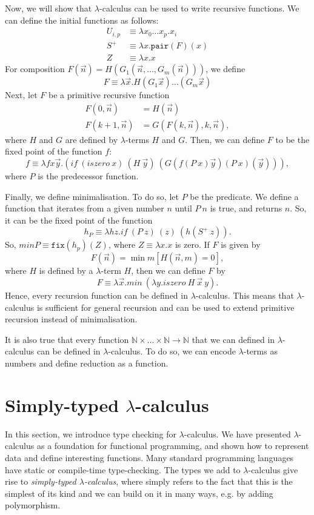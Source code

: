 \documentclass[a4paper, openany]{memoir}
\theoremstyle{definition}
\begin{document}
    Now, we will show that $\lambda$-calculus can be used to write recursive functions. We can define the initial functions as follows:
    \begin{align*}
        U_{i, p} &\equiv \lambda x_0 \dots x_p. x_i \\
        S^+ &\equiv \lambda x.\texttt{pair}(F)(x) \\
        Z &\equiv \lambda x.x
    \end{align*}
    For composition $F(\vec{n}) = H(G_1(\vec{n}, \dots, G_m(\vec{n})))$, we define
    \[F \equiv \lambda \vec{x}.H(G_1\vec{x}) \dots (G_m \vec{x})\]
    Next, let $F$ be a primitive recursive function
    \begin{align*}
        F(0, \vec{n}) &= H(\vec{n}) \\
        F(k+1, \vec{n}) &= G(F(k, \vec{n}), k, \vec{n}),
    \end{align*}
    where $H$ and $G$ are defined by $\lambda$-terms $H$ and $G$. Then, we can define $F$ to be the fixed point of the function $f$:
    \[f \equiv \lambda f x \vec{y}. (\textit{if} \ (\textit{iszero} \ x) \ (H \ \vec{y}) \ (G(f(P\ x) \vec{y}) (P \ x)(\vec{y}))),\]
    where $P$ is the predecessor function.

    Finally, we define minimalisation. To do so, let $P$ be the predicate. We define a function that iterates from a given number $n$ until $P \ n$ is true, and returns $n$. So, it can be the fixed point of the function
    \[h_P \equiv \lambda hz.\textit{if} \ (P \ z) \ (z) \ (h(S^+ \ z)).\]
    So, $\textit{min} P \equiv \texttt{fix}(h_p)(Z)$, where $Z \equiv \lambda x.x$ is zero. If $F$ is given by
    \[F(\vec{n}) = \min m[H(\vec{n}, m) = 0],\]
    where $H$ is defined by a $\lambda$-term $H$, then we can define $F$ by
    \[F \equiv \lambda \vec{x}.\textit{min} \ (\lambda y.\textit{iszero} \ H \ \vec{x} \ y).\]
    Hence, every recursion function can be defined in $\lambda$-calculus. This means that $\lambda$-calculus is sufficient for general recursion and can be used to extend primitive recursion instead of minimalisation.

    It is also true that every function $\mathbb{N} \times \dots \times \mathbb{N} \to \mathbb{N}$ that we can defined in $\lambda$-calculus can be defined in $\lambda$-calculus. To do so, we can encode $\lambda$-terms as numbers and define reduction as a function.
    \newpage

    \section{Simply-typed $\lambda$-calculus}
    In this section, we introduce type checking for $\lambda$-calculus. We have presented $\lambda$-calculus as a foundation for functional programming, and shown how to represent data and define interesting functions. Many standard programming languages have static or compile-time type-checking. The types we add to $\lambda$-calculus give rise to \emph{simply-typed $\lambda$-calculus}, where simply refers to the fact that this is the simplest of its kind and we can build on it in many ways, e.g. by adding polymorphism.
\end{document}
